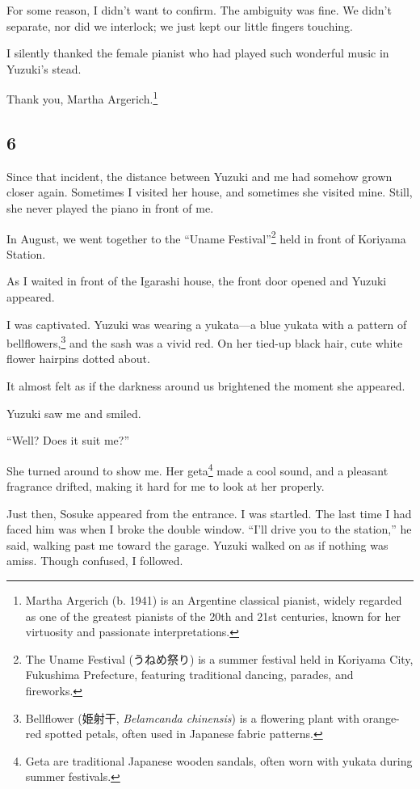 \documentclass[
    a4paper,
    12pt,
    twoside,
    openany,
    UTF8,
    fontset=windows
]{ctexbook}
\begin{document}
For some reason, I didn't want to confirm. The ambiguity was fine. We didn't separate, nor did we interlock; we just kept our little fingers touching.

I silently thanked the female pianist who had played such wonderful music in Yuzuki's stead.

Thank you, Martha Argerich.\footnote{Martha Argerich (b. 1941) is an Argentine classical pianist, widely regarded as one of the greatest pianists of the 20th and 21st centuries, known for her virtuosity and passionate interpretations.}


\subsection*{6}

Since that incident, the distance between Yuzuki and me had somehow grown closer again. Sometimes I visited her house, and sometimes she visited mine. Still, she never played the piano in front of me.

In August, we went together to the ``Uname Festival''\footnote{The Uname Festival (うねめ祭り) is a summer festival held in Koriyama City, Fukushima Prefecture, featuring traditional dancing, parades, and fireworks.} held in front of Koriyama Station.

As I waited in front of the Igarashi house, the front door opened and Yuzuki appeared.

I was captivated. Yuzuki was wearing a yukata---a blue yukata with a pattern of bellflowers,\footnote{Bellflower (姫射干, \textit{Belamcanda chinensis}) is a flowering plant with orange-red spotted petals, often used in Japanese fabric patterns.} and the sash was a vivid red. On her tied-up black hair, cute white flower hairpins dotted about.

It almost felt as if the darkness around us brightened the moment she appeared.

Yuzuki saw me and smiled.

``Well? Does it suit me?''

She turned around to show me. Her geta\footnote{Geta are traditional Japanese wooden sandals, often worn with yukata during summer festivals.} made a cool sound, and a pleasant fragrance drifted, making it hard for me to look at her properly.

Just then, Sosuke appeared from the entrance. I was startled. The last time I had faced him was when I broke the double window. ``I'll drive you to the station,'' he said, walking past me toward the garage. Yuzuki walked on as if nothing was amiss. Though confused, I followed.
\end{document}

